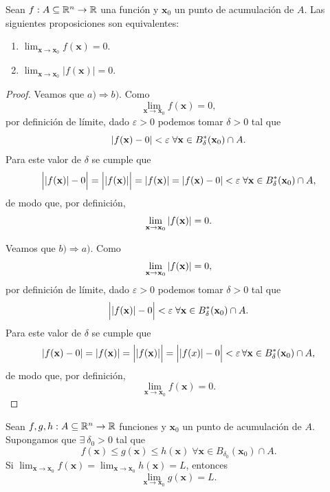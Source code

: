   \begin{propertie} \label{prop:lim_1}
    Sean $f:A  \subseteq  \mathbb{R}^n \to \mathbb{R}$ una funci\'on y $\mathbf{x}_0$ un punto de acumulaci\'on de $A$. Las siguientes proposiciones son equivalentes:
 \begin{enumerate} 
  \item[a)] $\lim_{\mathbf{x} \to \mathbf{x}_0} f(\mathbf{x}) = 0$.
  \item[b)] $\lim_{\mathbf{x} \to \mathbf{x}_0} | f(\mathbf{x}) | = 0$.
 \end{enumerate}
\end{propertie} 
\begin{proof}   Veamos que $a) \Rightarrow b).$  Como 
  \[
   \lim_{\mathbf{x} \to \mathbf{x}_0} f(\mathbf{x}) = 0,
  \]
  por definici\'on de l\'imite, dado $\varepsilon > 0$ podemos tomar $\delta > 0$ tal que 
  \[
   \abs{f(\mathbf{x}) - 0} < \varepsilon \; \forall \mathbf{x} \in B^*_{\delta}(\mathbf{x}_0) \cap A.
  \]
  Para este valor de $\delta$ se cumple que
  \[
   \Big| \abs{f(\mathbf{x})} - 0 \Big| = \Big| \abs{f(\mathbf{x})} \Big| = \abs{f(\mathbf{x})} = \abs{f(\mathbf{x}) - 0} < \varepsilon \; 
   \forall \mathbf{x} \in B^*_{\delta}(\mathbf{x}_0) \cap A,
  \]
  de modo que, por definici\'on, 
  \[
   \lim_{\mathbf{x} \to \mathbf{x}_0} \abs{ f(\mathbf{x}) } = 0.
  \]
  
Veamos que  $b) \Rightarrow a).$  Como
  \[
   \lim_{\mathbf{x} \to \mathbf{x}_0} \abs{ f(\mathbf{x}) } = 0,
  \]
  por definici\'on de l\'imite, dado $\varepsilon > 0$ podemos tomar $\delta > 0$ tal que 
  \[
   \Big| \abs{f(\mathbf{x})} - 0 \Big| < \varepsilon \; \forall \mathbf{x} \in B^*_{\delta}(\mathbf{x}_0) \cap A.
  \]
  Para este valor de $\delta$ se cumple que
  \[
   \abs{f(\mathbf{x}) - 0} = \abs{f(\mathbf{x})} = \Big| \abs{f(\mathbf{x})} \Big| = \Big| \abs{f(x)} - 0 \Big| < \varepsilon \, 
   \forall \mathbf{x} \in B^*_{\delta}(\mathbf{x}_0) \cap A,
  \]
  de modo que, por definici\'on, 
  \[
   \lim_{\mathbf{x} \to \mathbf{x}_0} f(\mathbf{x}) = 0.
  \]
 \end{proof}



\begin{propertie} \label{prop:sandwich} %
Sean $f, g, h : A  \subseteq  \mathbb{R}^n \to \mathbb{R}$ funciones y $\mathbf{x}_0$ un punto de acumulaci\'on de $A$. Supongamos que $\exists\: \delta_0 > 0$ tal que 
\[
 f(\mathbf{x}) \le g(\mathbf{x}) \le h(\mathbf{x}) \; \forall \mathbf{x} \in B_{\delta_0}(\mathbf{x}_0) \cap A.
\]
Si $\lim_{\mathbf{x} \to \mathbf{x}_0}f(\mathbf{x}) = \lim_{\mathbf{x} \to \mathbf{x}_0}h(\mathbf{x}) = L$, entonces
\[
 \lim_{\mathbf{x} \to \mathbf{x}_0}g(\mathbf{x}) = L.
\]
 
\end{propertie}

